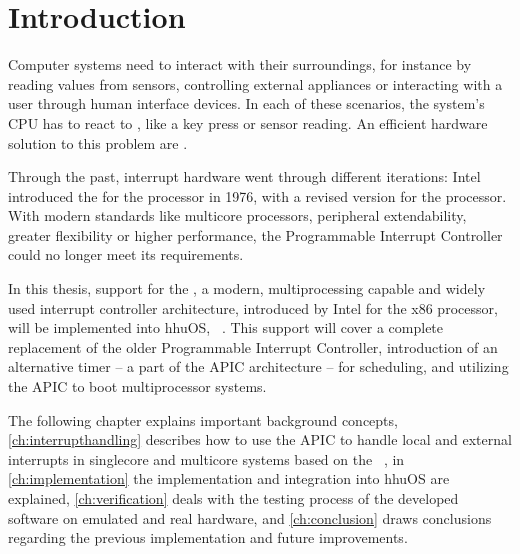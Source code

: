 \chapter{Introduction}
\label{ch:introduction}

\clearpage

Computer systems need to interact with their surroundings, for instance by reading values from sensors, controlling external appliances or interacting with a user through human interface devices.
In each of these scenarios, the system's CPU has to react to , like a key press or sensor reading.
An efficient hardware solution to this problem are .

Through the past, interrupt hardware went through different iterations: Intel introduced the  for the  processor in 1976, with a revised version for the  processor.
With modern standards like multicore processors, peripheral extendability, greater flexibility or higher performance, the Programmable Interrupt Controller could no longer meet its requirements.

In this thesis, support for the , a modern, multiprocessing capable and widely used interrupt controller architecture, introduced by Intel for the x86  processor, will be implemented into hhuOS, ~\autocite{hhuos}.
This support will cover a complete replacement of the older Programmable Interrupt Controller, introduction of an alternative timer -- a part of the APIC architecture -- for scheduling, and utilizing the APIC to boot multiprocessor systems.

The following chapter explains important background concepts, \autoref{ch:interrupthandling} describes how to use the APIC to handle local and external interrupts in singlecore and multicore systems based on the ~\autocite{ia32}, in \autoref{ch:implementation} the implementation and integration into hhuOS are explained, \autoref{ch:verification} deals with the testing process of the developed software on emulated and real hardware, and \autoref{ch:conclusion} draws conclusions regarding the previous implementation and future improvements.

\cleardoublepage